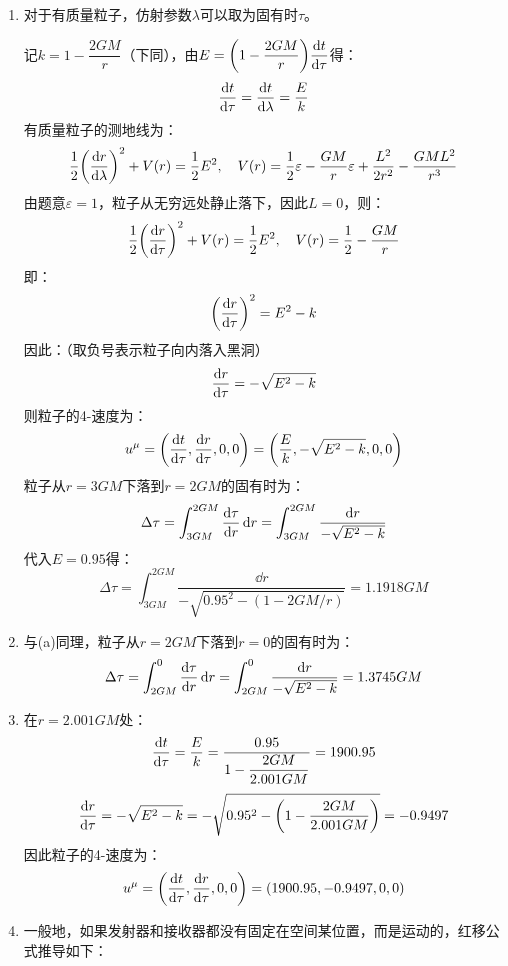 \documentclass[a4paper]{article}
\renewcommand\epsilon\varepsilon
\begin{document}
\begin{enumerate}
    \item[1.(a)]
    对于有质量粒子，仿射参数$\lambda$可以取为固有时$\tau$。

    记$k = 1 - \dfrac{2GM}{r}$（下同），由$E = \qty(1 - \dfrac{2GM}{r}) \dfrac{\dd t}{\dd\tau}$得：
    \[
        \dv{t}{\tau} = \dv{t}{\lambda} = \frac{E}{k}
    \]
    有质量粒子的测地线为：
    \[
        \frac{1}{2} \qty(\dv{r}{\lambda})^2 + V(r) = \frac{1}{2} E^2,\quad V(r) = \frac{1}{2} \epsilon - \frac{GM}{r} \epsilon + \frac{L^2}{2r^2} - \frac{GM L^2}{r^3}
    \]
    由题意$\epsilon = 1$，粒子从无穷远处静止落下，因此$L = 0$，则：
    \[
        \frac{1}{2} \qty(\dv{r}{\tau})^2 + V(r) = \frac{1}{2} E^2,\quad V(r) = \frac{1}{2} - \frac{GM}{r}
    \]
    即：
    \[
        \qty(\dv{r}{\tau})^2 = E^2 - k
    \]
    因此：（取负号表示粒子向内落入黑洞）
    \[
        \dv{r}{\tau} = -\sqrt{E^2 - k}
    \]
    则粒子的4-速度为：
    \[
        u^\mu = \qty(\dv{t}{\tau}, \dv{r}{\tau}, 0, 0) = \qty(\frac{E}{k}, -\sqrt{E^2 - k}, 0, 0)
    \]
    粒子从$r = 3GM$下落到$r = 2GM$的固有时为：
    \[
        \Delta \tau = \int_{3GM}^{2GM} \dv{\tau}{r} \dd{r} = \int_{3GM}^{2GM} \frac{\dd{r}}{-\sqrt{E^2 - k}}
    \]
    代入$E = 0.95$得：
    \[
        \Delta \tau = \int_{3GM}^{2GM} \frac{\dd{r}}{-\sqrt{0.95^2 - (1 - 2GM/r)}} = 1.1918GM
    \]


    \item[1.(b)]
    与(a)同理，粒子从$r = 2GM$下落到$r = 0$的固有时为：
    \[
        \Delta \tau = \int_{2GM}^{0} \dv{\tau}{r} \dd{r} = \int_{2GM}^{0} \frac{\dd{r}}{-\sqrt{E^2 - k}} = 1.3745GM
    \]

    \item[1.(c)]
    在$r = 2.001GM$处：
    \[
        \dv{t}{\tau} = \frac{E}{k} = \frac{0.95}{1 - \dfrac{2GM}{2.001GM}} = 1900.95
    \]
    \[
        \dv{r}{\tau} = -\sqrt{E^2 - k} = -\sqrt{0.95^2 - \qty(1 - \frac{2GM}{2.001GM})} = -0.9497
    \]
    因此粒子的4-速度为：
    \[
        u^\mu = \qty(\dv{t}{\tau}, \dv{r}{\tau}, 0, 0) = \qty(1900.95, -0.9497, 0, 0)
    \]

    \item[1.(d)]
    一般地，如果发射器和接收器都没有固定在空间某位置，而是运动的，红移公式推导如下：


\end{enumerate}
\end{document}
